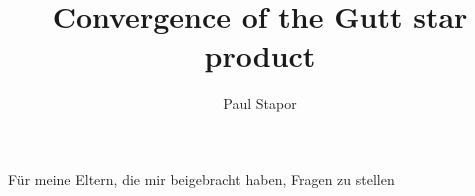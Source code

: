\documentclass[
11pt,                          %
english                        %
]{book}
\title{Convergence of the Gutt star product}
\author{Paul Stapor}
\begin{document}

%
\maketitle
\thispagestyle{empty}
\cleardoublepage

%
\begin{flushright}
	\vspace*{3cm}
	{\large
		Für meine Eltern, 
		die mir beigebracht haben, 
		Fragen zu stellen
	}
\end{flushright}
\thispagestyle{empty}

%
\tableofcontents
\thispagestyle{empty}






%






%






%






%






%






%






%






\end{document}
